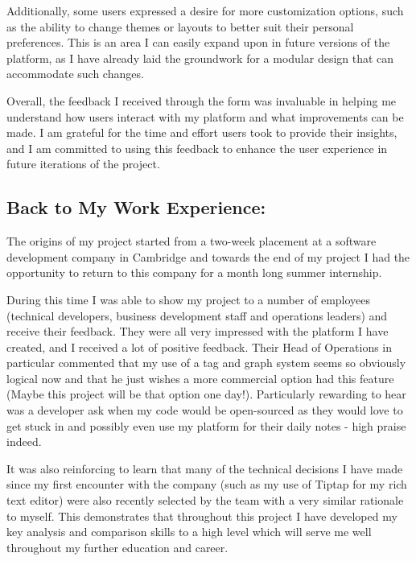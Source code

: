 Additionally, some users expressed a desire for more customization options, such as the ability to change themes or layouts to better suit their personal preferences. This is an area I can easily expand upon in future versions of the platform, as I have already laid the groundwork for a modular design that can accommodate such changes. 

Overall, the feedback I received through the form was invaluable in helping me understand how users interact with my platform and what improvements can be made. I am grateful for the time and effort users took to provide their insights, and I am committed to using this feedback to enhance the user experience in future iterations of the project.


\subsection*{Back to My Work Experience:}
The origins of my project started from a two-week placement at a software development company in Cambridge and towards the end of my project I had the opportunity to return to this company for a month long summer internship. 

During this time I was able to show my project to a number of employees (technical developers, business development staff and operations leaders) and receive their feedback. They were all very impressed with the platform I have created, and I received a lot of positive feedback. Their Head of Operations in particular commented that my use of a tag and graph system seems so obviously logical now and that he just wishes a more commercial option had this feature (Maybe this project will be that option one day!). Particularly rewarding to hear was a developer ask when my code would be open-sourced as they would love to get stuck in and possibly even use my platform for their daily notes - high praise indeed.

It was also reinforcing to learn that many of the technical decisions I have made since my first encounter with the company (such as my use of Tiptap for my rich text editor) were also recently selected by the team with a very similar rationale to myself. This demonstrates that throughout this project I have developed my key analysis and comparison skills to a high level which will serve me well throughout my further education and career. 